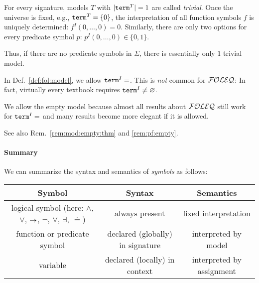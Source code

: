 \begin{example}
For every signature, models $T$ with $|\mathtt{term}^T|=1$ are called \emph{trivial}.
Once the universe is fixed, e.g., $\mathtt{term}^T=\{0\}$, the interpretation of all function symbols $f$ is uniquely determined: $f^I(0,\ldots,0)=0$.
Similarly, there are only two options for every predicate symbol $p$: $p^I(0,\ldots,0)\in\{0,1\}$.

Thus, if there are no predicate symbols in $\Sigma$, there is essentially only $1$ trivial model.
\end{example}

\begin{remark}\label{rem:mod:empty}
In Def.~\ref{def:fol:model}, we allow $\univ^I=\empty$.
This is \emph{not} common for ${\mathcal{FOLEQ}}$: In fact, virtually every textbook requires $\mathtt{term}^I\neq\varnothing$.

We allow the empty model because almost all results about ${\mathcal{FOLEQ}}$ still work for $\univ^I=\empty$ and many results become more elegant if it is allowed.

See also Rem.~\ref{rem:mod:empty:thm} and \ref{rem:pf:empty}.
\end{remark}

\paragraph{Summary}

We can summarize the syntax and semantics of \emph{symbols} as follows:
\begin{center}
\begin{tabular}{|c|c|c|}
\hline
Symbol & Syntax  & Semantics \\ \hline
logical symbol (here: $\wedge$, $\vee$, $\rightarrow$, $\neg$, $\forall$, $\exists$, $\doteq$)
  & always present & fixed interpretation \\
function or predicate symbol & declared (globally) in signature & interpreted by model \\
variable & declared (locally) in context & interpreted by assignment \\
\hline
\end{tabular}
\end{center}

